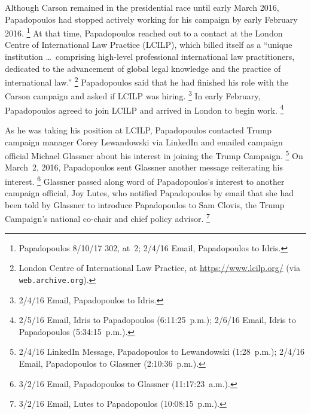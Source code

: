 Although Carson remained in the presidential race until early March 2016, Papadopoulos had stopped actively working for his campaign by early February 2016.%
\footnote{Papadopoulos 8/10/17 302, at~2; 2/4/16 Email, Papadopoulos to Idris.}
At that time, Papadopoulos reached out to a contact at the London Centre of International Law Practice (LCILP), which billed itself as a ``unique institution \dots\ comprising high-level professional international law practitioners, dedicated to the advancement of global legal knowledge and the practice of international law.''%
\footnote{London Centre of International Law Practice, at \url{https://www.lcilp.org/} (via \verb+web.archive.org+).}
Papadopoulos said that he had finished his role with the Carson campaign and asked if LCILP was hiring.%
\footnote{2/4/16 Email, Papadopoulos to Idris.}
In early February, Papadopoulos agreed to join LCILP and arrived in London to begin work.%
\footnote{2/5/16 Email, Idris to Papadopoulos (6:11:25~p.m.);
2/6/16 Email, Idris to Papadopoulos (5:34:15~p.m.).}

As he was taking his position at LCILP, Papadopoulos contacted Trump campaign manager Corey Lewandowski via LinkedIn and emailed campaign official Michael Glassner about his interest in joining the Trump Campaign.%
\footnote{2/4/16 LinkedIn Message, Papadopoulos to Lewandowski (1:28~p.m.);
2/4/16 Email, Papadopoulos to Glassner (2:10:36~p.m.).}
On March~2, 2016, Papadopoulos sent Glassner another message reiterating his interest.%
\footnote{3/2/16 Email, Papadopoulos to Glassner (11:17:23~a.m.).}
Glassner passed along word of Papadopoulos's interest to another campaign official, Joy Lutes, who notified Papadopoulos by email that she had been told by Glassner to introduce Papadopoulos to Sam Clovis, the Trump Campaign's national co-chair and chief policy advisor.%
\footnote{3/2/16 Email, Lutes to Papadopoulos (10:08:15~p.m.).}

